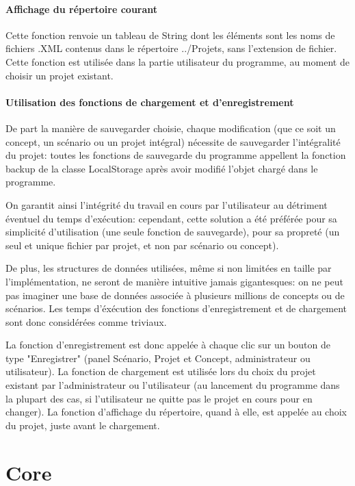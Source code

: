 \documentclass[12pt]{report}
\begin{document}
	\paragraph{Affichage du répertoire courant}

Cette fonction renvoie un tableau de String dont les éléments sont les noms de fichiers .XML contenus dans le répertoire ../Projets, sans l'extension
de fichier. Cette fonction est utilisée dans la partie utilisateur du programme, au moment de choisir un projet existant.


	\paragraph{Utilisation des fonctions de chargement et d'enregistrement}

De part la manière de sauvegarder choisie, chaque modification (que ce soit un concept, un scénario ou un projet intégral) nécessite de sauvegarder
l'intégralité du projet: toutes les fonctions de sauvegarde du programme appellent la fonction backup de la classe LocalStorage après avoir modifié
l'objet chargé dans le programme.

On garantit ainsi l'intégrité du travail en cours par l'utilisateur au détriment éventuel du temps d'exécution: cependant, cette solution a été
préférée pour sa simplicité d'utilisation (une seule fonction de sauvegarde), pour sa propreté (un seul et unique fichier par projet, et non par scénario ou concept).

De plus, les structures de données utilisées, même si non limitées en taille par l'implémentation, ne seront de manière intuitive jamais gigantesques:
on ne peut pas imaginer une base de données associée à plusieurs millions de concepts ou de scénarios. Les temps d'éxécution des fonctions d'enregistrement
et de chargement sont donc considérées comme triviaux.

La fonction d'enregistrement est donc appelée à chaque clic sur un bouton de type "Enregistrer" (panel Scénario, Projet et Concept, administrateur ou utilisateur).
La fonction de chargement est utilisée lors du choix du projet existant par l'administrateur ou l'utilisateur (au lancement du programme dans la plupart des cas,
si l'utilisateur ne quitte pas le projet en cours pour en changer).
La fonction d'affichage du répertoire, quand à elle, est appelée au choix du projet, juste avant le chargement.


\section{Core}
\end{document}
